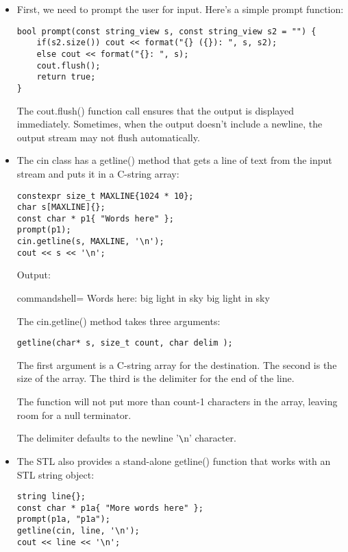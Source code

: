 \begin{itemize}
\item 
First, we need to prompt the user for input. Here's a simple prompt function:

\begin{lstlisting}[style=styleCXX]
bool prompt(const string_view s, const string_view s2 = "") {
	if(s2.size()) cout << format("{} ({}): ", s, s2);
	else cout << format("{}: ", s);
	cout.flush();
	return true;
}
\end{lstlisting}

The cout.flush() function call ensures that the output is displayed immediately. Sometimes, when the output doesn't include a newline, the output stream may not flush automatically.

\item 
The cin class has a getline() method that gets a line of text from the input stream and puts it in a C-string array:

\begin{lstlisting}[style=styleCXX]
constexpr size_t MAXLINE{1024 * 10};
char s[MAXLINE]{};
const char * p1{ "Words here" };
prompt(p1);
cin.getline(s, MAXLINE, '\n');
cout << s << '\n';
\end{lstlisting}

Output:

\begin{tcblisting}{commandshell={}}
Words here: big light in sky
big light in sky
\end{tcblisting}

The cin.getline() method takes three arguments:

\begin{lstlisting}[style=styleCXX]
getline(char* s, size_t count, char delim );
\end{lstlisting}

The first argument is a C-string array for the destination. The second is the size of the array. The third is the delimiter for the end of the line.

The function will not put more than count-1 characters in the array, leaving room for a null terminator.

The delimiter defaults to the newline '\verb|\|n' character.

\item 
The STL also provides a stand-alone getline() function that works with an STL string object:

\begin{lstlisting}[style=styleCXX]
string line{};
const char * p1a{ "More words here" };
prompt(p1a, "p1a");
getline(cin, line, '\n');
cout << line << '\n';
\end{lstlisting}


\end{itemize}

